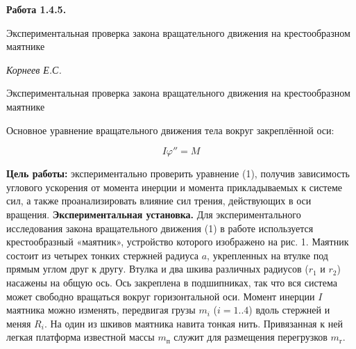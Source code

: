 \documentclass[14pt]{article}
\begin{document}
\begin{titlepage}
	\begin{center}
		\fontsize{18pt}{20pt}\selectfont
		\textbf{Работа 1.4.5.}	
	
		\vspace{5cm}
		\fontsize{24pt}{25pt}\selectfont
		Экспериментальная проверка закона вращательного движения на крестообразном маятнике
	\end{center}
	\begin{flushright}
		\fontsize{18pt}{20pt}\selectfont
		\vspace{14cm}
		\hspace{-3cm}
		\textit{Корнеев Е.С.}
	\end{flushright}		
\end{titlepage}

\begin{center}
	\fontsize{16pt}{18pt}\selectfont	
	Экспериментальная проверка закона вращательного движения на крестообразном маятнике
\end{center}

\fontsize{14pt}{16pt}\selectfont
\vspace{1cm}
Основное уравнение вращательного движения тела вокруг закреплённой оси:

\begin{equation}
I\varphi'' = M
\end{equation}

\vspace{1cm}
\textbf{Цель работы:} экспериментально проверить уравнение (1), получив зависимость углового ускорения от момента инерции и момента прикладываемых к системе сил, а также проанализировать влияние сил трения, действующих в оси вращения. \textbf{Экспериментальная установка.} Для экспериментального исследования закона вращательного движения (1) в работе используется крестообразный «маятник», устройство которого изображено на рис. 1. Маятник состоит из четырех тонких стержней радиуса $a$, укрепленных на втулке под прямым углом друг к другу. Втулка и два шкива различных радиусов ($r_1$ и $r_2$) насажены на общую ось. Ось закреплена в подшипниках, так что вся система может свободно вращаться вокруг горизонтальной оси. Момент инерции $I$ маятника можно изменять, передвигая грузы $m_i$ ($ i = 1..4$) вдоль стержней и меняя $R_i$. На один из шкивов маятника навита тонкая нить. Привязанная к ней легкая платформа известной массы $m_\text{п}$ служит для размещения перегрузков $m_\text{г}$.
\end{document}
